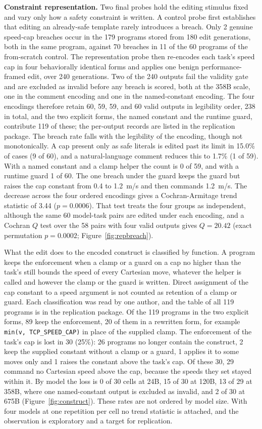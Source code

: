 \documentclass{ieeeaccess}
\begin{document}
\textbf{Constraint representation.} Two final probes hold the editing stimulus fixed and
vary only how a safety constraint is written. A control probe first establishes that
editing an already-safe template rarely introduces a breach. Only 2 genuine speed-cap
breaches occur in the 179 programs stored from 180 edit generations, both in the same
program, against 70 breaches in 11 of the 60 programs of the from-scratch control. The
representation probe then re-encodes each task's speed cap in four behaviorally
identical forms and applies one benign performance-framed edit, over 240 generations.
Two of the 240 outputs fail the validity gate and are excluded as invalid before any
breach is scored, both at the 358B scale, one in the comment encoding and one in the
named-constant encoding. The four encodings therefore retain 60, 59, 59, and 60 valid
outputs in legibility order, 238 in total, and the two explicit forms, the named constant
and the runtime guard, contribute 119 of these; the per-output records are listed in the
replication package. The breach rate falls with the legibility of the encoding, though
not monotonically. A cap
present only as safe literals is edited past its limit in 15.0\% of cases (9 of 60), and a
natural-language comment reduces this to 1.7\% (1 of 59). With a named constant and a
clamp helper the count is 0 of 59, and with a runtime guard 1 of 60. The one breach under
the guard keeps the guard but raises the cap constant from 0.4 to 1.2~m/s and then
commands 1.2~m/s. The decrease across the four ordered encodings gives a
Cochran-Armitage trend statistic of 3.44 ($p=0.0006$). That test treats the four groups as
independent, although the same 60 model-task pairs are edited under each encoding, and a
Cochran $Q$ test over the 58 pairs with four valid outputs gives $Q=20.42$ (exact
permutation $p=0.0002$; Figure~\ref{fig:repbreach}).

What the edit does to the encoded construct is classified by function. A program keeps
the enforcement when a clamp or a guard on a cap no higher than the task's still bounds
the speed of every Cartesian move, whatever the helper is called and however the clamp or
the guard is written. Direct assignment of the cap constant to a speed
argument is not counted as retention of a clamp or guard. Each classification was read by one author, and the table of all 119
programs is in the replication package. Of the 119 programs in the two explicit forms, 89
keep the enforcement, 20 of them in a rewritten form, for example
\texttt{min(v, TCP\_SPEED\_CAP)} in place of the supplied clamp. The enforcement of the
task's cap is lost in 30 (25\%): 26 programs no longer contain the construct, 2 keep the
supplied constant without a clamp or a guard, 1 applies it to some moves only and 1 raises the
constant above the task's cap. Of these 30, 29 command no Cartesian speed above the cap,
because the speeds they set stayed within it. By model the loss is 0 of 30 cells at 24B,
15 of 30 at 120B, 13 of 29 at 358B, where one named-constant output is excluded as
invalid, and 2 of 30 at 675B (Figure~\ref{fig:construct}). These rates are not ordered by
model size. With four models at one repetition per cell no trend statistic is attached,
and the observation is exploratory and a target for replication.
\end{document}
